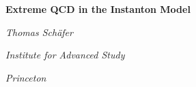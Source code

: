 

\textheight 28cm
\textwidth 16cm
\hoffset -1cm
\voffset -2cm


\pagestyle{plain}


\centerline{\Large\bf Extreme QCD in the Instanton Model}
\vspace*{0.8cm}
\centerline{\large\it Thomas Sch\"afer}
\vspace*{0.3cm}
\centerline{\large\it Institute for Advanced Study}
\vspace*{0.3cm}
\centerline{\large\it Princeton}


\begin{figure}[h]
\begin{center}
\begin{minipage}{70mm}
\epsfxsize=10cm
\end{minipage}
\end{center}
\end{figure}



\begin{figure}[h]
\begin{center}
\begin{minipage}{70mm}
\epsfxsize=6.2cm
\end{minipage}
\begin{minipage}{70mm}
\epsfxsize=6cm
\end{minipage}
\end{center}
\end{figure}





